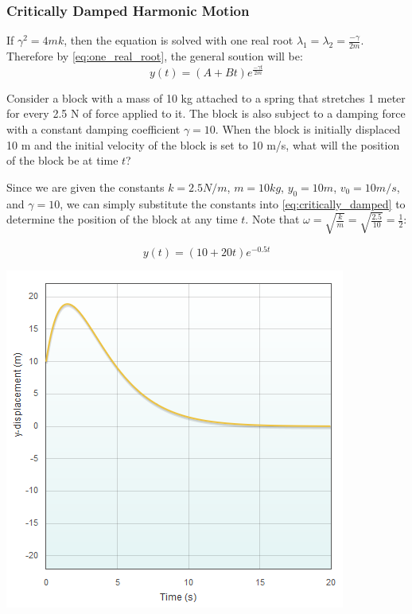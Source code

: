 \documentclass[11pt]{article} %
\newenvironment{Figure}
  {\par\medskip\noindent\minipage{\linewidth}}
  {\endminipage\par\medskip}
\begin{document}
\begin{multicols}{2}
\subsubsection {Critically Damped Harmonic Motion}
If ${\gamma}^2 = 4mk$, then the equation is solved with one real root ${\lambda}_1 = {\lambda}_2 = \frac{-\gamma}{2m}$. Therefore by \eqref{eq:one_real_root}, the general soution will be:
\begin{equation}\label{eq:critically_damped}
y(t) = (A + Bt)e^{{\frac{{-\gamma}t}{2m}}}	
\end{equation}

Consider a block with a mass of 10 kg attached to a spring that stretches 1 meter for every 2.5 N of force applied to it. The block is also subject to a damping force with a constant damping coefficient $\gamma = 10$. When the block is initially displaced 10 m and the initial velocity of the block is set to 10 m/s, what will the position of the block be at time $t$?

Since we are given the constants $k = 2.5 N/m$, $m = 10 kg$, $y_0 = 10 m$, $v_0 = 10 m/s$, and $\gamma = 10$, we can simply substitute the constants into \eqref{eq:critically_damped} to determine the position of the block at any time $t$. Note that $\omega = \sqrt{\frac{k}{m}} = \sqrt{\frac{2.5}{10}} = \frac{1}{2}$:

\begin{equation}
y(t) = (10 + 20t)e^{-0.5t}
\end{equation}

\begin{Figure}
 \centering
 \includegraphics[width=\linewidth]{critically_damped_free.png}
\end{Figure}


\end{multicols}
\end{document}
